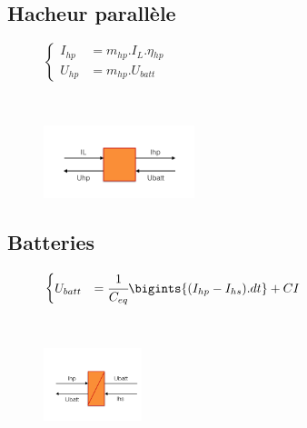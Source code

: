 \subsection{Hacheur parallèle}
\vspace{-10px}
\begin{figure}[ht]
\centering
\begin{minipage}{.5\textwidth}  
\centering
$\begin{cases}
	I_{hp} &= m_{hp}.I_{L}.\eta{}_{hp}\\
	U_{hp} &= m_{hp}.U_{batt}
\end{cases}$
\end{minipage}~
\begin{minipage}{.5\textwidth}
  \centering
\includegraphics[height=80px]{images/Chopperp.png}
\end{minipage}
\end{figure}
\FloatBarrier
\vspace{-20px}

\subsection{Batteries}
\vspace{-10px}
\begin{figure}[ht]
\centering
\begin{minipage}{.5\textwidth}  
\centering
$\begin{cases}
	 U_{batt} &= \cfrac{1}{C_{eq}}\bigints{(I_{hp}-I_{hs}).dt}+CI
\end{cases}$
\end{minipage}~
\begin{minipage}{.5\textwidth}
  \centering
\includegraphics[height=80px]{images/Batteries.png}
\end{minipage}
\end{figure}
\FloatBarrier
\vspace{-20px}

